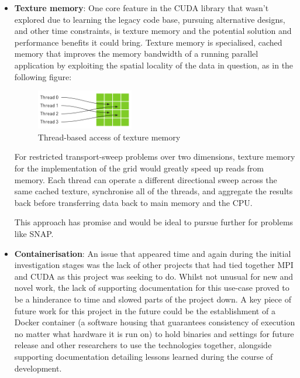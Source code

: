 \documentclass[conference]{IEEEtran}
\begin{document}
\begin{itemize}
    \item \textbf{Texture memory}: One core feature in the CUDA library that wasn't explored due to learning the legacy code base, pursuing alternative designs, and other time constraints, is texture memory and the potential solution and performance benefits it could bring. Texture memory is specialised, cached memory that improves the memory bandwidth of a running parallel application by exploiting the spatial locality of the data in question, as in the following figure:
    
        \begin{figure}[H]
            \centering
            \includegraphics[width=0.4\textwidth]{images/TextureMemory.png}
            \caption{Thread-based access of texture memory}
            \label{fig:texmem}
        \end{figure}
    
    For restricted transport-sweep problems over two dimensions, texture memory for the implementation of the grid would greatly speed up reads from memory. Each thread can operate a different directional sweep across the same cached texture, synchronise all of the threads, and aggregate the results back before transferring data back to main memory and the CPU. 

    This approach has promise and would be ideal to pursue further for problems like SNAP.

    \item \textbf{Containerisation}: An issue that appeared time and again during the initial investigation stages was the lack of other projects that had tied together MPI and CUDA as this project was seeking to do. Whilst not unusual for new and novel work, the lack of supporting documentation for this use-case proved to be a hinderance to time and slowed parts of the project down. A key piece of future work for this project in the future could be the establishment of a Docker container (a software housing that guarantees consistency of execution no matter what hardware it is run on) to hold binaries and settings for future release and other researchers to use the technologies together, alongside supporting documentation detailing lessons learned during the course of development.


\end{itemize}
\end{document}
